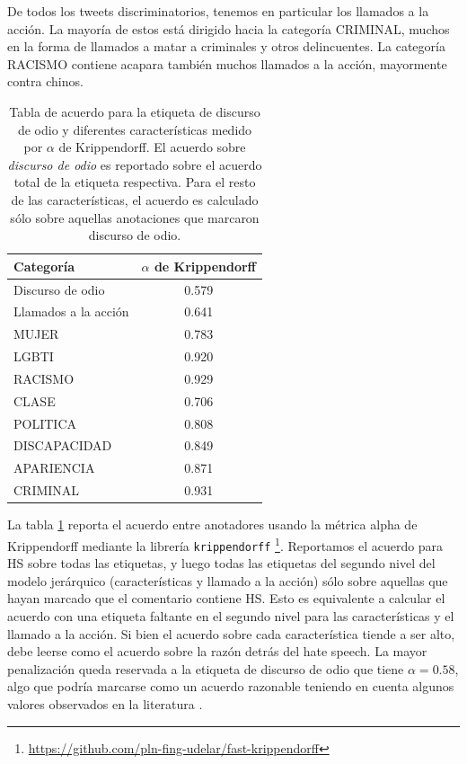 De todos los tweets discriminatorios, tenemos en particular los llamados a la acción. La mayoría de estos está dirigido hacia la categoría CRIMINAL, muchos en la forma de llamados a matar a criminales y otros delincuentes. La categoría RACISMO contiene acapara también muchos llamados a la acción, mayormente contra chinos.


\begin{table}
    \centering
    \begin{tabular}{lc}
        \toprule
        Categoría   & $\alpha$ de Krippendorff \\
        \midrule
        Discurso de odio     &  0.579 \\
        Llamados a la acción &  0.641 \\
        \midrule
        MUJER                &  0.783 \\
        LGBTI                &  0.920 \\
        RACISMO              &  0.929 \\
        CLASE                &  0.706 \\
        POLITICA             &  0.808 \\
        DISCAPACIDAD         &  0.849 \\
        APARIENCIA           &  0.871 \\
        CRIMINAL             &  0.931 \\
        \bottomrule
    \end{tabular}
    \caption{Tabla de acuerdo para la etiqueta de discurso de odio y diferentes características medido por $\alpha$ de Krippendorff. El acuerdo sobre \emph{discurso de odio} es reportado sobre el acuerdo total de la etiqueta respectiva. Para el resto de las características, el acuerdo es calculado sólo sobre aquellas anotaciones que marcaron discurso de odio.}
    \label{tab:annotation_agreement}
\end{table}

La tabla \ref{tab:annotation_agreement} reporta el acuerdo entre anotadores usando la métrica alpha de Krippendorff \cite{krippendorff2018content} mediante la librería \verb|krippendorff| \footnote{\url{https://github.com/pln-fing-udelar/fast-krippendorff}}. Reportamos el acuerdo para HS sobre todas las etiquetas, y luego todas las etiquetas del segundo nivel del modelo jerárquico (características y llamado a la acción) sólo sobre aquellas que hayan marcado que el comentario contiene HS. Esto es equivalente a calcular el acuerdo con una etiqueta faltante en el segundo nivel para las características y el llamado a la acción. Si bien el acuerdo sobre cada característica tiende a ser alto, debe leerse como el acuerdo sobre la razón detrás del hate speech. La mayor penalización queda reservada a la etiqueta de discurso de odio que tiene $\alpha = 0.58$, algo que podría marcarse como un acuerdo razonable teniendo en cuenta algunos valores observados en la literatura \cite{poletto2021resources}.



